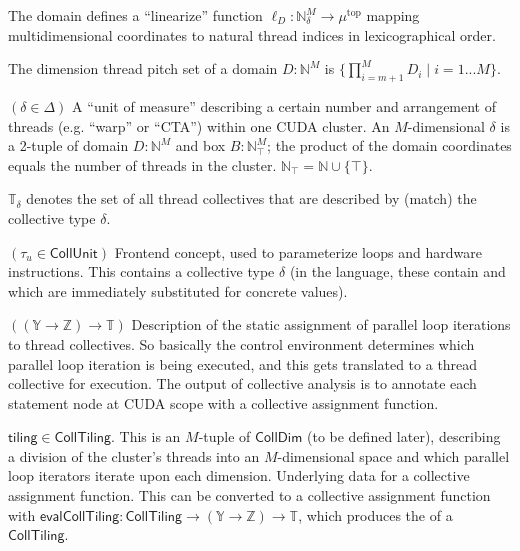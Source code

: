 The domain defines a ``linearize'' function $\ell_D: \mathbb{N}^M_\delta \to \mu^\text{top}$ mapping multidimensional coordinates to natural thread indices in lexicographical order.

\filbreak
{} The dimension thread pitch set of a domain $D: \mathbb{N}^M$ is $\{ \prod_{i=m+1}^M D_i \mid i = 1 ... M \}$.

\filbreak
{} $(\delta \in \Delta)$ A ``unit of measure'' describing a certain number and arrangement of threads (e.g. ``warp'' or ``CTA'') within one CUDA cluster.
An $M$-dimensional $\delta$ is a 2-tuple of domain $D: \mathbb{N}^M$ and box $B: \mathbb{N}_\top^M$; the product of the domain coordinates equals the number of threads in the cluster.
$\mathbb{N}_\top = \mathbb{N} \cup \{\top\}$.

$\mathbb{T}_\delta$ denotes the set of all thread collectives that are described by (match) the collective type $\delta$.

\filbreak
{} $(\tau_u \in \mathsf{CollUnit})$
Frontend concept, used to parameterize  loops and hardware instructions.
This contains a collective type $\delta$ (in the language, these contain  and  which are immediately substituted for concrete values).

\filbreak
{} $((\mathbb{Y} \to \mathbb{Z}) \to \mathbb{T})$
Description of the static assignment of parallel loop iterations to thread collectives.
So basically the control environment determines which parallel loop iteration is being executed, and this gets translated to a thread collective for execution.
The output of collective analysis is to annotate each statement node at CUDA scope with a collective assignment function.

\filbreak
{} $\mathsf{tiling} \in \mathsf{CollTiling}$.
This is an $M$-tuple of $\mathsf{CollDim}$ (to be defined later), describing a division of the cluster's threads into an $M$-dimensional space and which parallel loop iterators iterate upon each dimension.
Underlying data for a collective assignment function.
This can be converted to a collective assignment function with $\mathsf{evalCollTiling}: \mathsf{CollTiling} \to (\mathbb{Y} \to \mathbb{Z}) \to \mathbb{T}$,
which produces the  of a $\mathsf{CollTiling}$.


\filbreak
{}

